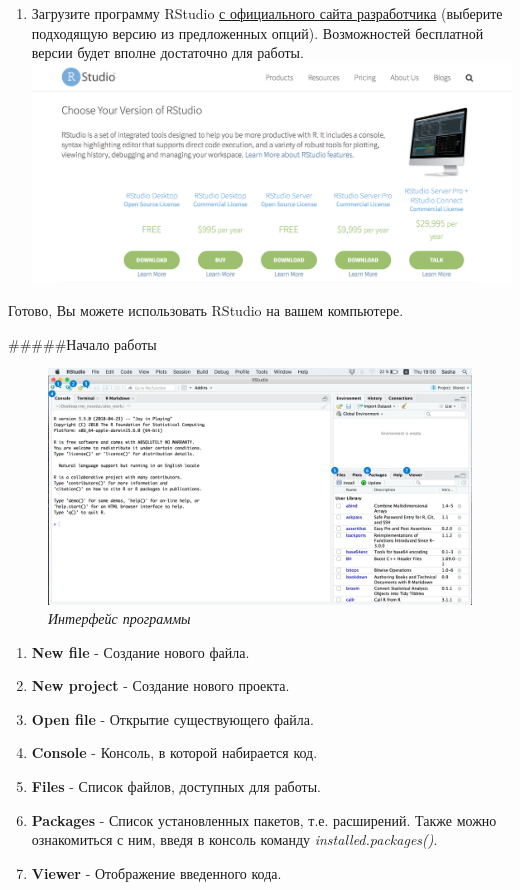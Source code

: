 \documentclass[]{book}
\providecommand{\tightlist}{%
  \setlength{\itemsep}{0pt}\setlength{\parskip}{0pt}}
\begin{document}
\begin{enumerate}
\def\labelenumi{\arabic{enumi}.}
\setcounter{enumi}{1}
\tightlist
\item
  Загрузите программу RStudio \href{https://www.rstudio.com/products/rstudio/download/}{с официального сайта разработчика} (выберите подходящую версию из предложенных опций). Возможностей бесплатной версии
  будет вполне достаточно для работы.
  \includegraphics{images/RStudio.png}
\end{enumerate}

Готово, Вы можете использовать RStudio на вашем компьютере.

\#\#\#\#\#Начало работы

\begin{figure}
\centering
\includegraphics{images/RStudio_Interface.png}
\caption{\emph{Интерфейс программы}}
\end{figure}

\begin{enumerate}
\def\labelenumi{\arabic{enumi}.}
\item
  \textbf{New file} - Создание нового файла.
\item
  \textbf{New project} - Создание нового проекта.
\item
  \textbf{Open file} - Открытие существующего файла.
\item
  \textbf{Console} - Консоль, в которой набирается код.
\item
  \textbf{Files} - Список файлов, доступных для работы.
\item
  \textbf{Packages} - Список установленных пакетов, т.е. расширений. Также можно ознакомиться с ним, введя в консоль команду \emph{installed.packages()}.
\item
  \textbf{Viewer} - Отображение введенного кода.
\end{enumerate}
\end{document}
